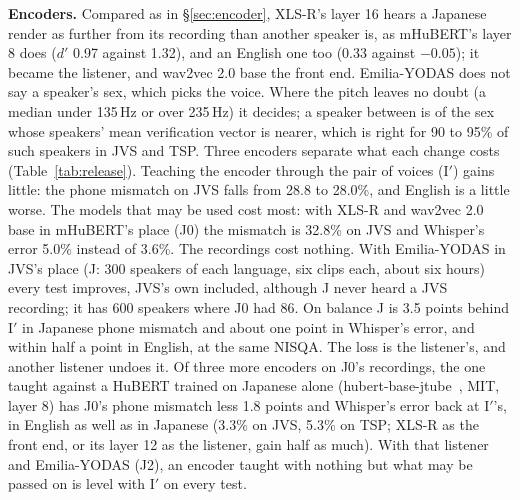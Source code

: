 \documentclass[10pt,a4paper,twocolumn]{article}
\begin{document}
\textbf{Encoders.} Compared as in \S\ref{sec:encoder}, XLS-R's layer 16 hears a Japanese render as
further from its recording than another speaker is, as mHuBERT's layer 8 does ($d'$ 0.97 against
1.32), and an English one too (0.33 against $-0.05$); it became the listener, and wav2vec 2.0
base the front end. Emilia-YODAS does not say a speaker's sex, which picks the voice. Where the
pitch leaves no doubt (a median under 135\,Hz or over 235\,Hz) it decides; a speaker between is
of the sex whose speakers' mean verification vector is nearer, which is right for 90 to 95\% of
such speakers in JVS and TSP. Three encoders separate what each change costs
(Table~\ref{tab:release}). Teaching the encoder through the pair of voices (I$'$) gains little: the
phone mismatch on JVS falls from 28.8 to 28.0\%, and English is a little worse. The models that
may be used cost most: with XLS-R and wav2vec 2.0 base in mHuBERT's place (J0) the mismatch is
32.8\% on JVS and Whisper's error 5.0\% instead of 3.6\%. The recordings cost nothing. With
Emilia-YODAS in JVS's place (J: 300 speakers of each language, six clips each, about six hours)
every test improves, JVS's own included, although J never heard a JVS recording; it has 600
speakers where J0 had 86. On balance J is 3.5 points behind I$'$ in Japanese phone mismatch and
about one point in Whisper's error, and within half a point in English, at the same NISQA.
The loss is the listener's, and another listener undoes it. Of three more encoders on J0's
recordings, the one taught against a HuBERT trained on Japanese alone (hubert-base-jtube~\cite{jtube},
MIT, layer 8) has J0's phone mismatch less 1.8 points and Whisper's error back at I$'$'s, in
English as well as in Japanese (3.3\% on JVS, 5.3\% on TSP; XLS-R as the front end, or its
layer 12 as the listener, gain half as much). With that listener and Emilia-YODAS (J2), an
encoder taught with nothing but what may be passed on is level with I$'$ on every test.
\end{document}
